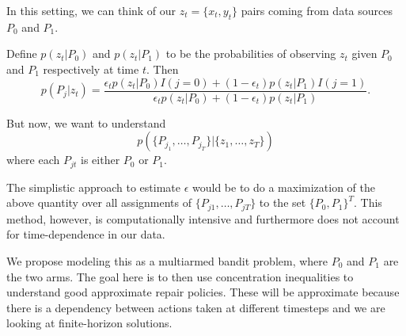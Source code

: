 \documentclass[english]{article}
\numberwithin{equation}{section}
\begin{document}
	In this setting, we can think of our $z_t=\{x_t,y_t\}$ pairs coming from data sources $P_0$ and $P_1$.
	
	Define $p(z_t|P_0)$ and $p(z_t|P_1)$ to be the probabilities of observing $z_t$ given $P_0$ and $P_1$ respectively at time $t$. Then $$p(P_j|z_t)=\frac{\epsilon_t p(z_t|P_0) I(j=0) + (1-\epsilon_t) p(z_t|P_1) I(j=1)}{\epsilon_t p(z_t|P_0) + (1-\epsilon_t) p(z_t|P_1)}.$$
	
	But now, we want to understand
	$$p(\{P_{j_1},\ldots,P_{j_T}\}|\{z_1,\ldots,z_T\})$$ where each $P_{jt}$ is either $P_0$ or $P_1$.
	
	The simplistic approach to estimate $\epsilon$ would be to do a maximization of the above quantity over all assignments of $\{P_{j1},\ldots,P_{jT}\}$ to the set $\{P_0,P_1\}^T$. This method, however, is computationally intensive and furthermore does not account for time-dependence in our data.
	
	We propose modeling this as a multiarmed bandit problem, where $P_0$ and $P_1$ are the two arms. The goal here is to then use concentration inequalities to understand good approximate repair policies. These will be approximate because there is a dependency between actions taken at different timesteps and we are looking at finite-horizon solutions.
	
	
\end{document}
